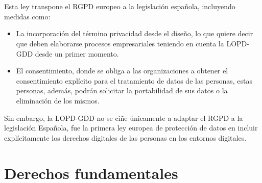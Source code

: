 \begin{refsection}
\\ \\
Esta ley transpone el RGPD europeo a la legislación española, incluyendo medidas como:
\begin{itemize}
  \item La incorporación del término privacidad desde el diseño, lo que quiere decir que deben elaborarse procesos empresariales teniendo en cuenta la LOPD-GDD desde un primer momento. 
  \item El consentimiento, donde se obliga a las organizaciones a obtener el consentimiento explícito para el tratamiento de datos de las personas, estas personas, además, podrán solicitar la portabilidad de sus datos o la eliminación de los mismos.
\end{itemize}
Sin embargo, la LOPD-GDD no se ciñe únicamente a adaptar el RGPD a la legislación Española, fue la primera ley europea de protección de datos en incluir explícitamente los derechos digitales de las personas en los entornos digitales.

\section{Derechos fundamentales}\label{appendix:ProteccionDatos_Derechos}


\end{refsection}
